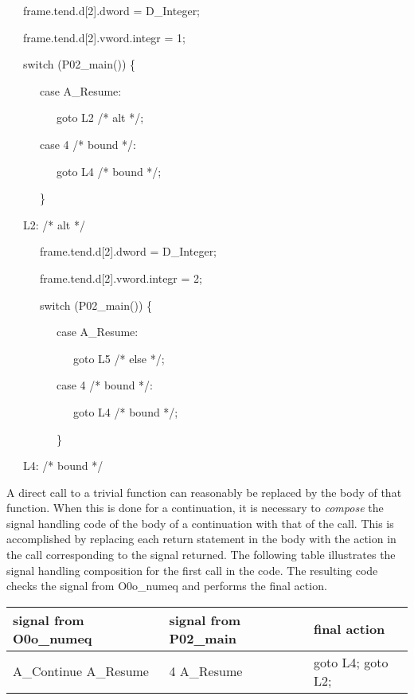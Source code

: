 {\ttfamily\mdseries
\ \ \ frame.tend.d[2].dword = D\_Integer;}

{\ttfamily\mdseries
\ \ \ frame.tend.d[2].vword.integr = 1;}

{\ttfamily\mdseries
\ \ \ switch (P02\_main()) \{}

{\ttfamily\mdseries
\ \ \ \ \ \ case A\_Resume:}

{\ttfamily\mdseries
\ \ \ \ \ \ \ \ \ goto L2 /* alt */;}

{\ttfamily\mdseries
\ \ \ \ \ \ case 4 /* bound */:}

{\ttfamily\mdseries
\ \ \ \ \ \ \ \ \ goto L4 /* bound */;}

{\ttfamily\mdseries
\ \ \ \ \ \ \}}

{\ttfamily\mdseries
\ \ \ L2: /* alt */}

{\ttfamily\mdseries
\ \ \ \ \ \ frame.tend.d[2].dword = D\_Integer;}

{\ttfamily\mdseries
\ \ \ \ \ \ frame.tend.d[2].vword.integr = 2;}

{\ttfamily\mdseries
\ \ \ \ \ \ switch (P02\_main()) \{}

{\ttfamily\mdseries
\ \ \ \ \ \ \ \ \ case A\_Resume:}

{\ttfamily\mdseries
\ \ \ \ \ \ \ \ \ \ \ \ goto L5 /* else */;}

{\ttfamily\mdseries
\ \ \ \ \ \ \ \ \ case 4 /* bound */:}

{\ttfamily\mdseries
\ \ \ \ \ \ \ \ \ \ \ \ goto L4 /* bound */;}

{\ttfamily\mdseries
\ \ \ \ \ \ \ \ \ \}}

{\ttfamily\mdseries
\ \ \ L4: /* bound */}


A direct call to a trivial function can reasonably be replaced by the
body of that function. When this is done for a continuation, it is
necessary to \textit{compose} the signal handling code of the body of
a continuation with that of the call. This is accomplished by
replacing each return statement in the body with the action in the
call corresponding to the signal returned. The following table
illustrates the signal handling composition for the first call in the
code.  The resulting code checks the signal from O0o\_numeq and
performs the final action.

\begin{center}
\tablefirsthead{}
\tablehead{}
\tabletail{}
\tablelasttail{}
\begin{supertabular}{|m{1.7879599in}|m{1.6031599in}|m{1.0469599in}|}
\hline
 signal from O0o\_numeq  &
 signal from P02\_main  &
 final action \\\hline
 A\_Continue\newline
A\_Resume  &
 4\newline
A\_Resume  &
 goto L4;\newline
goto L2; \\\hline
\end{supertabular}
\end{center}

